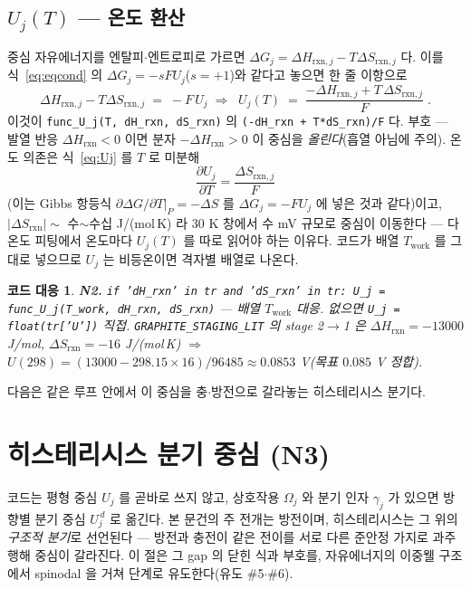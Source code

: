 \documentclass[11pt,a4paper]{article}
\newtheorem*{codebox}{코드 대응}
\newcommand{\rxn}{\mathrm{rxn}}
\newcommand{\work}{\mathrm{work}}
\newcommand{\code}[1]{\texttt{#1}}
\begin{document}
\subsection{$U_j(T)$ — 온도 환산}
중심 자유에너지를 엔탈피$\cdot$엔트로피로 가르면 $\Delta G_j=\Delta H_{\rxn,j}-T\Delta S_{\rxn,j}$ 다. 이를
식~\eqref{eq:eqcond} 의 $\Delta G_j=-sFU_j$($s=+1$)와 같다고 놓으면 한 줄 이항으로
\begin{equation}
\Delta H_{\rxn,j}-T\Delta S_{\rxn,j}\;=\;-F\,U_j
\;\Longrightarrow\;
\boxed{\;U_j(T)\;=\;\frac{-\Delta H_{\rxn,j}+T\,\Delta S_{\rxn,j}}{F}\;.}
\label{eq:Uj}
\end{equation}
이것이 \code{func\_U\_j(T, dH\_rxn, dS\_rxn)} 의 \code{(-dH\_rxn + T*dS\_rxn)/F} 다. 부호 --- 발열 반응
$\Delta H_\rxn<0$ 이면 분자 $-\Delta H_\rxn>0$ 이 중심을 \emph{올린다}(흡열 아님에 주의). 온도 의존은 식~\eqref{eq:Uj}
를 $T$ 로 미분해
\begin{equation}
\frac{\partial U_j}{\partial T}=\frac{\Delta S_{\rxn,j}}{F}
\label{eq:dUdT}
\end{equation}
(이는 Gibbs 항등식 $\partial\Delta G/\partial T|_P=-\Delta S$ 를 $\Delta G_j=-FU_j$ 에 넣은 것과 같다)이고,
$|\Delta S_\rxn|\sim$ 수$\sim$수십 J/(mol\,K) 라 $30$ K 창에서 수 mV 규모로 중심이 이동한다 --- 다온도 피팅에서 온도마다
$U_j(T)$ 를 따로 읽어야 하는 이유다. 코드가 배열 $T_\work$ 를 그대로 넣으므로 $U_j$ 는 비등온이면 격자별 배열로 나온다.

\begin{codebox}
\textbf{N2.} \code{if 'dH\_rxn' in tr and 'dS\_rxn' in tr: U\_j = func\_U\_j(T\_work, dH\_rxn, dS\_rxn)}
--- 배열 $T_\work$ 대응. 없으면 \code{U\_j = float(tr['U'])} 직접. \code{GRAPHITE\_STAGING\_LIT} 의 stage 2$\to$1 은
$\Delta H_\rxn=-13000$ J/mol, $\Delta S_\rxn=-16$ J/(mol\,K) $\Rightarrow$ $U(298)=(13000-298.15\times16)/96485
\approx0.0853$ V(목표 $0.085$ V 정합).
\end{codebox}

다음은 같은 루프 안에서 이 중심을 충$\cdot$방전으로 갈라놓는 히스테리시스 분기다.

\section{히스테리시스 분기 중심 (N3)}\label{sec:hys}
코드는 평형 중심 $U_j$ 를 곧바로 쓰지 않고, 상호작용 $\Omega_j$ 와 분기 인자 $\gamma_j$ 가 있으면 방향별 분기 중심
$U_j^{\,d}$ 로 옮긴다. 본 문건의 주 전개는 방전이며, 히스테리시스는 그 위의 \emph{구조적 분기}로 선언된다 --- 방전과 충전이
같은 전이를 서로 다른 준안정 가지로 과주행해 중심이 갈라진다. 이 절은 그 gap 의 닫힌 식과 부호를, 자유에너지의 이중웰
구조에서 spinodal 을 거쳐 단계로 유도한다(유도 \#5$\cdot$\#6).
\end{document}

